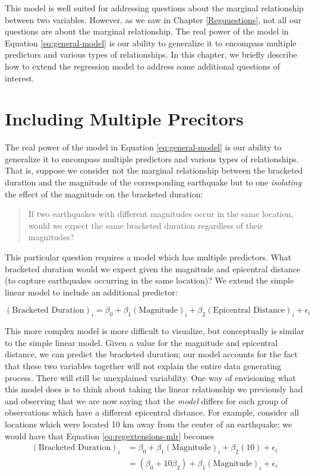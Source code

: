 \documentclass[
]{book}
\theoremstyle{plain}
\theoremstyle{mydefn}
\theoremstyle{myexmpl}
\theoremstyle{remark}
\begin{document}
This model is well suited for addressing questions about the marginal relationship between two variables. However, as we saw in Chapter \ref{Regquestions}, not all our questions are about the marginal relationship. The real power of the model in Equation \eqref{eq:general-model} is our ability to generalize it to encompass multiple predictors and various types of relationships. In this chapter, we briefly describe how to extend the regression model to address some additional questions of interest.

\hypertarget{including-multiple-precitors}{%
\section{Including Multiple Precitors}\label{including-multiple-precitors}}

The real power of the model in Equation \eqref{eq:general-model} is our ability to generalize it to encompass multiple predictors and various types of relationships. That is, suppose we consider not the marginal relationship between the bracketed duration and the magnitude of the corresponding earthquake but to one \emph{isolating} the effect of the magnitude on the bracketed duration:

\begin{quote}
If two earthquakes with different magnitudes occur in the same location, would we expect the same bracketed duration regardless of their magnitudes?
\end{quote}

This particular question requires a model which has multiple predictors. What bracketed duration would we expect given the magnitude and epicentral distance (to capture earthquakes occurring in the same location)? We extend the simple linear model to include an additional predictor:

\begin{equation}
  (\text{Bracketed Duration})_i = \beta_0 + \beta_1(\text{Magnitude})_i + \beta_2(\text{Epicentral Distance})_i + \epsilon_i
  \label{eq:regextensions-mlr}
\end{equation}

This more complex model is more difficult to visualize, but conceptually is similar to the simple linear model. Given a value for the magnitude and epicentral distance, we can predict the bracketed duration; our model accounts for the fact that these two variables together will not explain the entire data generating process. There will still be unexplained variability. One way of envisioning what this model does is to think about taking the linear relationship we previously had and observing that we are now saying that the \emph{model} differs for each group of observations which have a different epicentral distance. For example, consider all locations which were located 10 km away from the center of an earthquake; we would have that Equation \eqref{eq:regextensions-mlr} becomes
\[
\begin{aligned}
(\text{Bracketed Duration})_i &= \beta_0 + \beta_1(\text{Magnitude})_i + \beta_2(10) + \epsilon_i \\
  &= \left(\beta_0 + 10\beta_2\right) + \beta_1(\text{Magnitude})_i + \epsilon_i
\end{aligned}
\]
\end{document}
